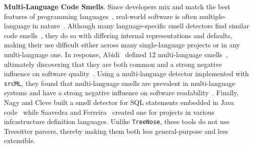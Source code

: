 {\bf Multi-Language Code Smells}.
%
Since developers mix and match the best features of programming
languages~\cite{7476675}, real-world software is often multiple-language in
nature~\cite{723183}.
%
Although many language-specific smell detectors find similar code
smells~\cite{PMD,CheckStyle,Pysmell,Jscent,DesigniteJava}, they do so with
differing internal representations and defaults, making their use difficult
either across many single-language projects or in any multi-language one.
%
In response, Abidi~\etal{} defined 12 multi-language
smells~\cite{MultiLanguageCodeSmells}, ultimately discovering that they are
both common and a strong negative influence on software quality~\cite{Abidi2}.
%
Using a multi-language detector implemented with \texttt{srcML}, they found
that multi-language smells are prevalent in multi-language systems and have a
strong negative influence on software readability~\cite{Fault-Prone}.
%
Finally, Nagy and Cleve built a smell detector for SQL statements embedded in
Java code~\cite{SQLInJava} while Saavedra and Ferreira~\cite{Saavedra2023}
created one for projects in various infrastructure definition languages.
%
Unlike \texttt{TreeNose}, these tools do not use Treesitter parsers, thereby
making them both less general-purpose and less extensible.
